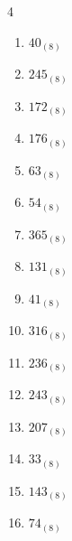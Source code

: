 \begin{multicols}{4}
\begin{enumerate}
  \item $40_{(8)}$

        \phantom{$=32$}

\columnbreak %

  \item $245_{(8)}$

        \phantom{$=165$}

  \item $172_{(8)}$

        \phantom{$=122$}

  \item $176_{(8)}$

        \phantom{$=126$}

  \item $63_{(8)}$

        \phantom{$=51$}

  \item $54_{(8)}$

        \phantom{$=44$}

  \item $365_{(8)}$

        \phantom{$=245$}

  \item $131_{(8)}$

        \phantom{$=89$}

  \item $41_{(8)}$

        \phantom{$=33$}

  \item $316_{(8)}$

        \phantom{$=206$}

  \item $236_{(8)}$

        \phantom{$=158$}

  \item $243_{(8)}$

        \phantom{$=163$}

  \item $207_{(8)}$

        \phantom{$=135$}

  \item $33_{(8)}$

        \phantom{$=27$}

  \item $143_{(8)}$

        \phantom{$=99$}

  \item $74_{(8)}$


\end{enumerate}
\end{multicols}
